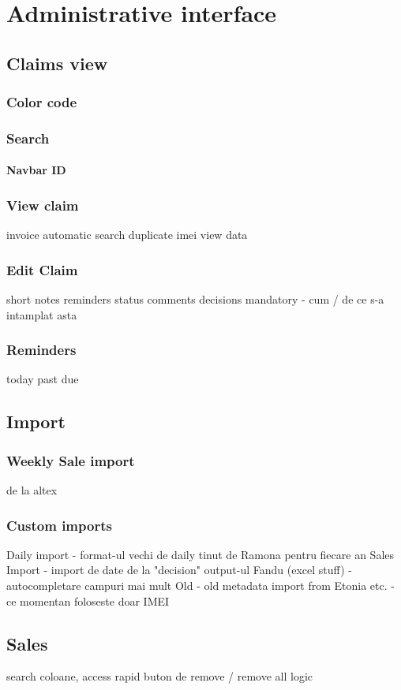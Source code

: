 \section{Administrative interface}
	\subsection{Claims view}
		\subsubsection{Color code}
		\subsubsection{Search}
			\paragraph{Navbar ID}
		\subsubsection{View claim}
			invoice automatic search
			duplicate imei
			view data
		\subsubsection{Edit Claim}
				short notes
				reminders
				status
				comments
				decisions mandatory - cum / de ce s-a intamplat asta
		\subsubsection{Reminders}
				today
				past due
	\subsection{Import}
		\subsubsection{Weekly Sale import}
			de la altex
		\subsubsection{Custom imports}
			Daily import - format-ul vechi de daily tinut de Ramona pentru fiecare an
			Sales Import - import de date de la "decision" output-ul Fandu (excel stuff) - autocompletare campuri mai mult
			Old - old metadata import from Etonia etc. - ce momentan foloseste doar IMEI
	\subsection{Sales}
		search coloane, access rapid
		buton de remove / remove all logic
